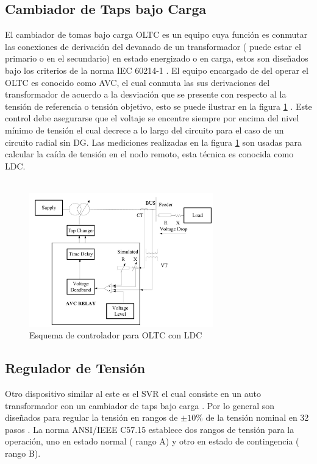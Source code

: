 \documentclass[12pt, letterpaper]{report}
\begin{document}
 \subsection{Cambiador de Taps bajo Carga}
El cambiador de tomas bajo carga \ac{OLTC} es un equipo  cuya función es conmutar las conexiones de derivación del devanado de un transformador ( puede estar el primario o en el secundario) en estado energizado o en carga, estos son diseñados bajo los criterios de la norma IEC 60214-1 \cite{IEC60214}.
El equipo encargado de del operar el \ac{OLTC} es conocido como \ac{AVC}, el cual conmuta las sus derivaciones del transformador de acuerdo a la desviación que se presente con respecto al la tensión de referencia o tensión objetivo, esto se puede ilustrar en la figura \ref{fig:esqusema_LDC} \cite{Sarimuthu2016}. Este control debe asegurarse que el voltaje se encentre siempre por encima del nivel mínimo de tensión el cual decrece a lo largo del circuito \cite{Sarimuthu2016} para el caso de un circuito radial sin DG. Las  mediciones realizadas en la figura \ref{fig:esqusema_LDC} son usadas para calcular la caída de tensión en el nodo remoto, esta técnica es conocida como \ac{LDC}.\\\\

\begin{figure}
\centering
\caption{Esquema de controlador para OLTC con LDC \cite{Sarimuthu2016}}
\label{fig:esqusema_LDC}
\includegraphics[width=8cm]{imagenes/cap_2/LDC}
\end{figure}


\subsection{Regulador de Tensión}
Otro dispositivo similar al este es el \ac{SVR} el cual consiste en un auto transformador con un cambiador de taps  bajo carga \cite{Vkdulqj}. Por lo general son diseñados para regular la tensión en rangos de $\pm 10 \%$ de la tensión nominal en 32 pasos \cite{kersting2009modeling} \cite{farag2012incorporating}. La norma ANSI/IEEE C57.15 establece dos rangos de tensión para la operación, uno en estado normal ( rango A) y otro en estado de contingencia ( rango B).
\end{document}
